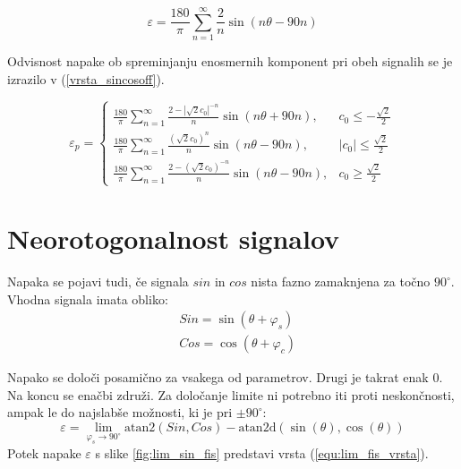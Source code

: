 

\begin{equation}
\varepsilon = \frac{180}{\pi}\sum_{n=1}^{\infty}\frac{2}{n} \sin (n \theta- 90 n)
\end{equation}


Odvisnost napake ob spreminjanju enosmernih komponent pri obeh signalih se je izrazilo v (\ref{vrsta_sincosoff}).


\begin{equation}
\label{vrsta_sincosoff}
\varepsilon_p=
\begin{cases}
\frac{180}{\pi}\sum_{n=1}^{\infty}\frac{2-|\sqrt{2}c_0|^{-n}}{n} \sin (n \theta + 90 n), & c_0\leq -\frac{\sqrt{2}}{2} \\
\frac{180}{\pi}\sum_{n=1}^{\infty}\frac{(\sqrt{2}c_0)^n}{n} \sin (n \theta - 90 n), & |c_0|\leq \frac{\sqrt{2}}{2} \\
\frac{180}{\pi}\sum_{n=1}^{\infty}\frac{2-(\sqrt{2}c_0)^{-n}}{n} \sin (n \theta - 90 n), & c_0\geq \frac{\sqrt{2}}{2}
\end{cases}
\end{equation}





\section{Neorotogonalnost signalov}

Napaka se pojavi tudi, če signala $sin$ in $cos$ nista fazno zamaknjena za točno $90^\circ$.
Vhodna signala imata obliko:
\begin{eqnarray}
\label{equ:def_sin_fis}
&Sin = \sin(\theta + \varphi_{s})\\
\label{equ:def_cos_fis}
&Cos =\cos(\theta+\varphi_{c})
\end{eqnarray}

Napako se določi posamično za vsakega od parametrov. Drugi je takrat enak 0. Na koncu se enačbi združi. Za določanje limite ni potrebno iti proti neskončnosti, ampak le do najslabše možnosti, ki je pri $\pm 90^\circ$:
\begin{equation}
\label{equ:fis_lim}
\varepsilon = \lim_{\varphi_{s} \rightarrow 90^\circ} \mathrm{atan2}(Sin ,Cos)- \mathrm{atan2d}(\sin(\theta),\cos(\theta))
\end{equation}
Potek napake $\varepsilon$ s slike \ref{fig:lim_sin_fis} predstavi vrsta (\ref{equ:lim_fis_vrsta}).

